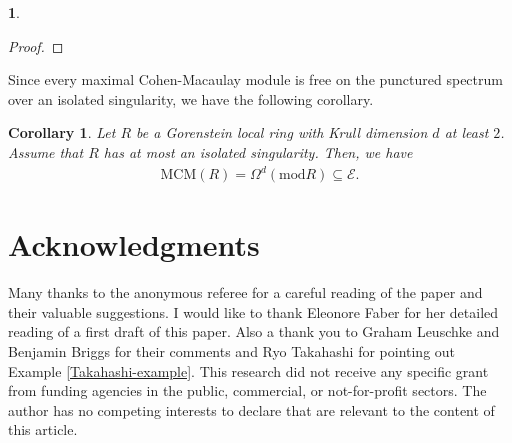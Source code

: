 \documentclass[12pt]{amsart}
\newcommand{\module}{\mathrm{mod}}
\newcommand{\MCM}{\mathrm{MCM}}
\newcommand{\EE}{\mathcal{E}}
\newtheorem{corollary}[theorem]{Corollary}
\theoremstyle{definition}
\newtheorem{chunk}[theorem]{}
\numberwithin{equation}{theorem}
\begin{document}
\begin{chunk}
\begin{proof}
\end{proof}
Since every maximal Cohen-Macaulay module is free on the punctured spectrum over an isolated singularity, we have the following corollary.
\begin{corollary}
    Let $R$ be a Gorenstein local ring with Krull dimension $d$ at least $2$. Assume that $R$ has at most an isolated singularity. Then, we have
    \begin{align*}
        \MCM(R) = \Omega^d(\module R) \subseteq \EE.
    \end{align*}
\end{corollary}

\end{chunk}

\section{Acknowledgments}

Many thanks to the anonymous referee for a careful reading of the paper and their valuable suggestions. I would like to thank Eleonore Faber for her detailed reading of a first draft of this paper. Also a thank you to Graham Leuschke and Benjamin Briggs for their comments and Ryo Takahashi for pointing out Example \ref{Takahashi-example}. This research did not receive any specific grant from funding agencies in the public, commercial, or not-for-profit sectors. The author has no competing interests to declare that are relevant to the content of this article.






\end{document}
